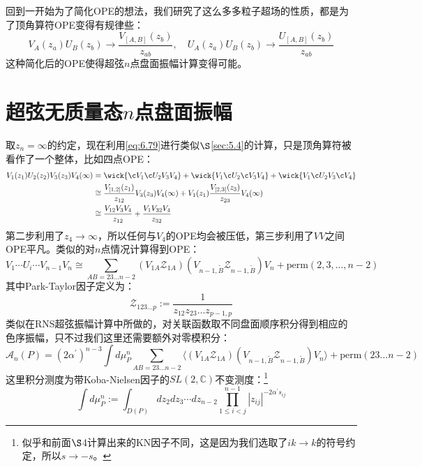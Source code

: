 回到一开始为了简化OPE的想法，我们研究了这么多多粒子超场的性质，都是为了顶角算符OPE变得有规律些：
\begin{equation}
	\label{eq:6.79}
	V_A(z_a)U_B(z_b)\to\frac{V_{[A,B]}(z_b)}{z_{ab}},\quad U_A(z_a)U_B(z_b)\to\frac{U_{[A,B]}(z_b)}{z_{ab}}
\end{equation}
这种简化后的OPE使得超弦$n$点盘面振幅计算变得可能。

\section{超弦无质量态$n$点盘面振幅}
取$z_n=\infty$的约定，现在利用\ref{eq:6.79}进行类似$\S$\ref{sec:5.4}的计算，只是顶角算符被看作了一个整体，比如四点OPE：
\begin{equation}
	\label{eq:6.80}
	\begin{aligned}
		V_1(z_1)U_2(z_2)V_3(z_3)V_4(\infty)&=\wick{\c V_1\c U_2V_3V_4}+\wick{ V_1\c U_2\c V_3V_4}+\wick{V_1\c U_2V_3\c V_4}\\
		&\cong\frac{V_{[1,2]}(z_1)}{z_{12}}V_3(z_3)V_4(\infty)+V_1(z_1)\frac{V_{[2,3]}(z_3)}{z_{23}}V_4(\infty)\\&\cong\frac{V_{12}V_3V_4}{z_{12}}+\frac{V_1V_{32}V_4}{z_{32}}
	\end{aligned}
\end{equation}
第二步利用了$z_4\to\infty$，所以任何与$V_4$的OPE均会被压低，第三步利用了$VV$之间OPE平凡。类似的对$n$点情况计算得到OPE：
\begin{equation}
	V_1\cdots U_i\cdots V_{n-1}V_n\cong\sum_{AB=23...n-2}(V_{1A}\mathcal{Z}_{1A})(V_{n-1,\tilde{B}}\mathcal{Z}_{n-1,\tilde{B}})V_n+\mathrm{perm}(2,3,...,n-2)
\end{equation}
其中Park-Taylor因子定义为：
\begin{equation}
	\mathcal{Z}_{123...p}:=\frac{1}{z_{12}z_{23}\ldots z_{p-1,p}}
\end{equation}
类似在RNS超弦振幅计算中所做的，对关联函数取不同盘面顺序积分得到相应的色序振幅，只不过我们这里还需要额外对零模积分：
\begin{equation}
	\label{eq:6.85}
\boxed{
		\mathcal{A}_n(P)=(2\alpha^{\prime})^{n-3}\int d\mu_P^n\sum_{AB=23...n-2}\langle\left(V_{1A}\mathcal{Z}_{1A}\right)(V_{n-1,\tilde{B}}\mathcal{Z}_{n-1,\tilde{B}})V_n\rangle+\mathrm{perm}(23\ldots n-2)
}
\end{equation}
这里积分测度为带Koba-Nielsen因子的$SL(2,\mathbb{C})$不变测度：\footnote{似乎和前面$\S$4计算出来的KN因子不同，这是因为我们选取了$ik\to k$的符号约定，所以$s\to -s$。}
\begin{equation}
	\int d\mu_P^n:=\int_{D(P)}dz_2dz_3\cdots dz_{n-2}\prod_{1\leq i<j}^{n-1}|z_{ij}|^{-2\alpha^{\prime}s_{ij}}
\end{equation}

